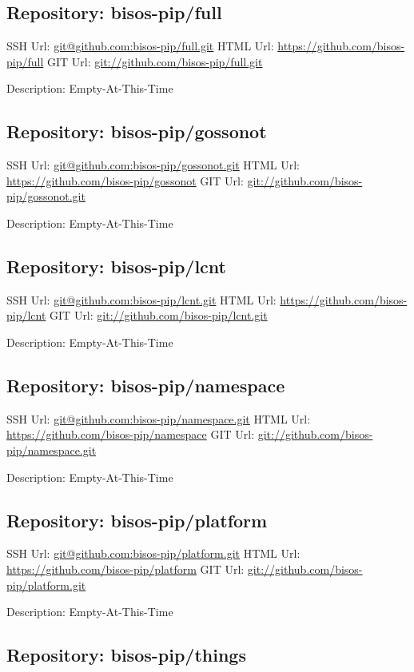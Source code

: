 \subsection{Repository: bisos-pip/full}

SSH Url:  \url{git@github.com:bisos-pip/full.git}
HTML Url: \url{https://github.com/bisos-pip/full}
GIT Url:  \url{git://github.com/bisos-pip/full.git}

Description: Empty-At-This-Time

\subsection{Repository: bisos-pip/gossonot}

SSH Url:  \url{git@github.com:bisos-pip/gossonot.git}
HTML Url: \url{https://github.com/bisos-pip/gossonot}
GIT Url:  \url{git://github.com/bisos-pip/gossonot.git}

Description: Empty-At-This-Time

\subsection{Repository: bisos-pip/lcnt}

SSH Url:  \url{git@github.com:bisos-pip/lcnt.git}
HTML Url: \url{https://github.com/bisos-pip/lcnt}
GIT Url:  \url{git://github.com/bisos-pip/lcnt.git}

Description: Empty-At-This-Time

\subsection{Repository: bisos-pip/namespace}

SSH Url:  \url{git@github.com:bisos-pip/namespace.git}
HTML Url: \url{https://github.com/bisos-pip/namespace}
GIT Url:  \url{git://github.com/bisos-pip/namespace.git}

Description: Empty-At-This-Time

\subsection{Repository: bisos-pip/platform}

SSH Url:  \url{git@github.com:bisos-pip/platform.git}
HTML Url: \url{https://github.com/bisos-pip/platform}
GIT Url:  \url{git://github.com/bisos-pip/platform.git}

Description: Empty-At-This-Time

\subsection{Repository: bisos-pip/things}


